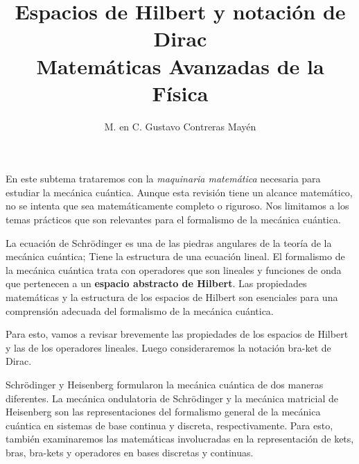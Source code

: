 
\title{Espacios de Hilbert y notación de Dirac \\ \large {Matemáticas Avanzadas de la Física}\vspace{-3ex}}

\author{M. en C. Gustavo Contreras Mayén}
\date{ }

\pagestyle{fancy}
\fancyhf{}
\lhead{\leftmark}
\rfoot{\thepage}
\setlength{\headheight}{16pt}%



\maketitle
\fontsize{14}{14}\selectfont
\tableofcontents
\newpage


En este subtema trataremos con la \emph{maquinaria matemática} necesaria para estudiar la mecánica cuántica. Aunque esta revisión tiene un alcance matemático, no se intenta que sea matemáticamente completo o riguroso. Nos limitamos a los temas prácticos que son relevantes para el formalismo de la mecánica cuántica.
\par
La ecuación de Schrödinger es una de las piedras angulares de la teoría de la mecánica cuántica; Tiene la estructura de una ecuación lineal. El formalismo de la mecánica cuántica trata con operadores que son lineales y funciones de onda que pertenecen a un \textbf{espacio abstracto de Hilbert}. Las propiedades matemáticas y la estructura de los espacios de Hilbert son esenciales para una comprensión adecuada del formalismo de la mecánica cuántica.
\par
Para esto, vamos a revisar brevemente las propiedades de los espacios de Hilbert y las de los operadores lineales. Luego consideraremos la notación bra-ket de Dirac.
\par
Schrödinger y Heisenberg formularon la mecánica cuántica de dos maneras diferentes. La mecánica ondulatoria de Schrödinger y la mecánica matricial de Heisenberg son las representaciones del formalismo general de la mecánica cuántica en sistemas de base continua y discreta, respectivamente. Para esto, también examinaremos las matemáticas involucradas en la representación de kets, bras, bra-kets y operadores en bases discretas y continuas.

\newpage

